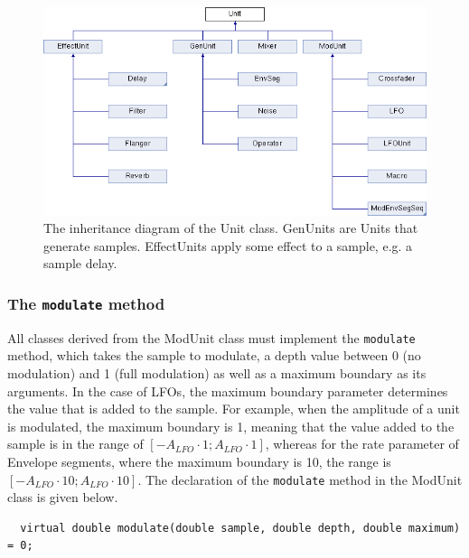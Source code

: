 \documentclass[12pt,twoside]{report}
\begin{document}
\begin{figure}
  \includegraphics[scale=0.5]{img/unit-inherit}
  \caption{The inheritance diagram of the Unit class. GenUnits are Units that generate samples. EffectUnits apply some effect to a sample, e.g. a sample delay.}
  \label{fig:unit-inherit}
\end{figure}


\subsubsection{The \texttt{modulate} method}

All classes derived from the ModUnit class must implement the \texttt{modulate} method, which takes the sample to modulate, a depth value between 0 (no modulation) and 1 (full modulation) as well as a maximum boundary as its arguments. In the case of LFOs, the maximum boundary parameter determines the value that is added to the sample. For example, when the amplitude of a unit is modulated, the maximum boundary is 1, meaning that the value added to the sample is in the range of $[-A_{LFO} \cdot 1; A_{LFO} \cdot 1]$, whereas for the rate parameter of Envelope segments, where the maximum boundary is 10, the range is $[-A_{LFO} \cdot 10; A_{LFO} \cdot 10]$. The declaration of the \texttt{modulate} method in the ModUnit class is given below.

\begin{lstlisting}
  virtual double modulate(double sample, double depth, double maximum) = 0;
\end{lstlisting}
\end{document}
